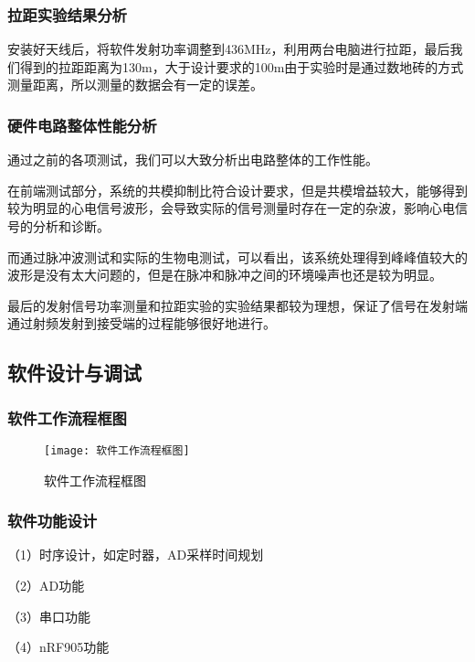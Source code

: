 \documentclass{zjureport}
\begin{document}
	\subsubsection{拉距实验结果分析}
	
	安装好天线后，将软件发射功率调整到436MHz，利用两台电脑进行拉距，最后我们得到的拉距距离为130m，大于设计要求的100m由于实验时是通过数地砖的方式测量距离，所以测量的数据会有一定的误差。
	
	\subsubsection{硬件电路整体性能分析}
	
	通过之前的各项测试，我们可以大致分析出电路整体的工作性能。
	
	在前端测试部分，系统的共模抑制比符合设计要求，但是共模增益较大，能够得到较为明显的心电信号波形，会导致实际的信号测量时存在一定的杂波，影响心电信号的分析和诊断。
	
	而通过脉冲波测试和实际的生物电测试，可以看出，该系统处理得到峰峰值较大的波形是没有太大问题的，但是在脉冲和脉冲之间的环境噪声也还是较为明显。
	
	最后的发射信号功率测量和拉距实验的实验结果都较为理想，保证了信号在发射端通过射频发射到接受端的过程能够很好地进行。
	
	\subsection{软件设计与调试}
	
	\subsubsection{软件工作流程框图}
	
	\begin{figure}[H]
		\centering%
		\texttt{[image: 软件工作流程框图]}
		\caption{软件工作流程框图}%
		\label{软件工作流程框图}%
	\end{figure}
	
	\subsubsection{软件功能设计}
	
	（1）时序设计，如定时器，AD采样时间规划   
	
	（2）AD功能                   
	
	（3）串口功能              
	
	（4）nRF905功能            
	
\end{document}

